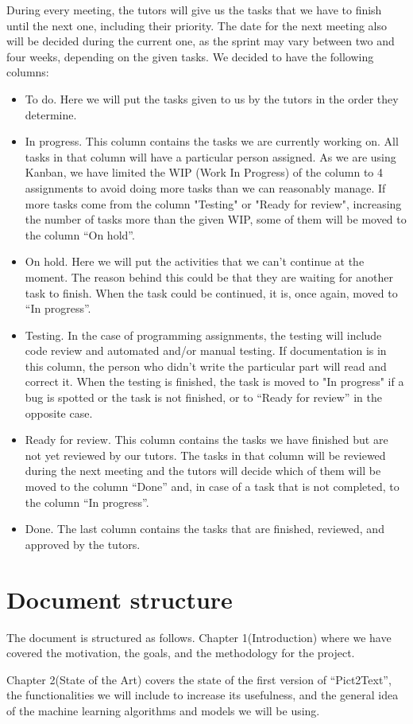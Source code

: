 During every meeting, the tutors will give us the tasks that we have to finish until the next one, including their priority. The date for the next meeting also will be decided during the current one, as the sprint may vary between two and four weeks, depending on the given tasks. We decided to have the following columns:
\begin{itemize}
\item To do. Here we will put the tasks given to us by the tutors in the order they determine. 

\item In progress. This column contains the tasks we are currently working on. All tasks in that column will have a particular person assigned. As we are using Kanban, we have limited the WIP (Work In Progress) of the column to 4 assignments to avoid doing more tasks than we can reasonably manage. If more tasks come from the column "Testing" or "Ready for review", increasing the number of tasks more than the given WIP, some of them will be moved to the column ``On hold''.

\item On hold. Here we will put the activities that we can't continue at the moment. The reason behind this could be that they are waiting for another task to finish. When the task could be continued, it is, once again, moved to ``In progress''.

\item Testing. In the case of programming assignments, the testing will include code review and automated and/or manual testing. 
If documentation is in this column, the person who didn't write the particular part will read and correct it. 
When the testing is finished, the task is moved to "In progress" if a bug is spotted or the task is not finished, or to ``Ready for review'' in the opposite case. 

\item Ready for review.  This column contains the tasks we have finished but are not yet reviewed by our tutors. The tasks in that column will be reviewed during the next meeting and the tutors will decide which of them will be moved to the column ``Done'' and, in case of a task that is not completed, to the column ``In progress''.
\item Done. The last column contains the tasks that are finished, reviewed, and approved by the tutors.
\end{itemize}

\section{Document structure}

The document is structured as follows. Chapter 1(Introduction) where we have covered the motivation, the goals, and the methodology for the project.

Chapter 2(State of the Art) covers the state of the first version of ``Pict2Text'', the functionalities we will include to increase its usefulness, and the general idea of the machine learning algorithms and models we will be using. 






